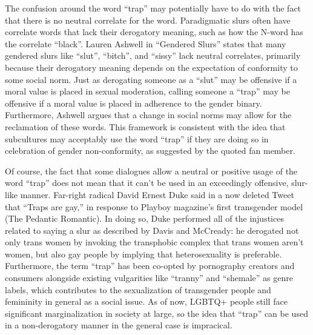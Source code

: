 \documentclass[12pt, letterpaper]{article}
\begin{document}
\begin{mla}
The confusion around the word ``trap'' may potentially have to do with the
fact that there is no neutral correlate for the word. Paradigmatic slurs often
have correlate words that lack their derogatory meaning, such as how the
N-word has the correlate ``black''. Lauren Ashwell in ``Gendered Slurs''
states that many gendered slurs like ``slut'', ``bitch'', and ``sissy'' lack
neutral correlates, primarily because their derogatory meaning depends on the
expectation of conformity to some social norm. Just as derogating someone as a
``slut'' may be offensive if a moral value is placed in sexual moderation,
calling someone a ``trap'' may be offensive if a moral value is placed in
adherence to the gender binary. Furthermore, Ashwell argues that a change in
social norms may allow for the reclamation of these words. This framework is
consistent with the idea that subcultures may acceptably use the word ``trap''
if they are doing so in celebration of gender non-conformity, as suggested by
the quoted fan member.

Of course, the fact that some dialogues allow a neutral or positive usage of
the word ``trap'' does not mean that it can't be used in an exceedingly
offensive, slur-like manner. Far-right radical David Ernest Duke said in a
now deleted Tweet that ``Traps are gay,'' in response to Playboy magazine's
first transgender model (The Pedantic Romantic). In doing so, Duke performed
all of the injustices related to saying a slur as described by Davis and
McCready: he derogated not only trans women by invoking the transphobic
complex that trans women aren't women, but also gay people by implying that
heterosexuality is preferable. Furthermore, the term ``trap'' has been
co-opted by pornography creators and consumers alongside existing vulgarities
like ``tranny'' and ``shemale'' as genre labels, which contributes to the
sexualization of transgender people and femininity in general as a social
issue. As of now, LGBTQ+ people still face significant marginalization in
society at large, so the idea that ``trap'' can be used in a non-derogatory
manner in the general case is impracical.


\end{mla}
\end{document}
